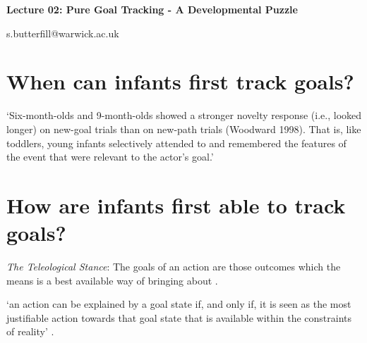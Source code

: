\documentclass[12pt]{extarticle}
\date{}
\makeatletter
\def \ititle {Origins of Mind}
\def \iemail{s.butterfill@warwick.ac.uk}
\makeatother
\begin{document}
\begin{multicols*}{3}

\setlength\footnotesep{1em}










\def \ititle {Lecture 02: Pure Goal Tracking - A Developmental Puzzle}

\begin{center}

{\Large

\textbf{\ititle}

}



\iemail %

\end{center}

 
 
\section{When can infants first track goals?}
 
‘Six-month-olds and 9-month-olds showed a stronger novelty response (i.e., looked longer) on new-goal trials than on new-path trials (Woodward 1998). That is, like toddlers, young infants selectively attended to and remembered the features of the event that were relevant to the actor’s goal.'
\citep[p.\ 153]{woodward:2001_making}
 
 
 
\section{How are infants first able to track goals?}
 
\emph{The Teleological Stance}: The goals of an action are those outcomes which the means is a best available way of bringing about \citep{Gergely:1995sq,Csibra:1998cx}.

‘an action can be explained by a goal state if, and only if, it is seen as  the  most justifiable action towards that goal state that is available within the constraints of reality’
\citep[p.~255]{Csibra:1998cx}.




\end{multicols*}
\end{document}
